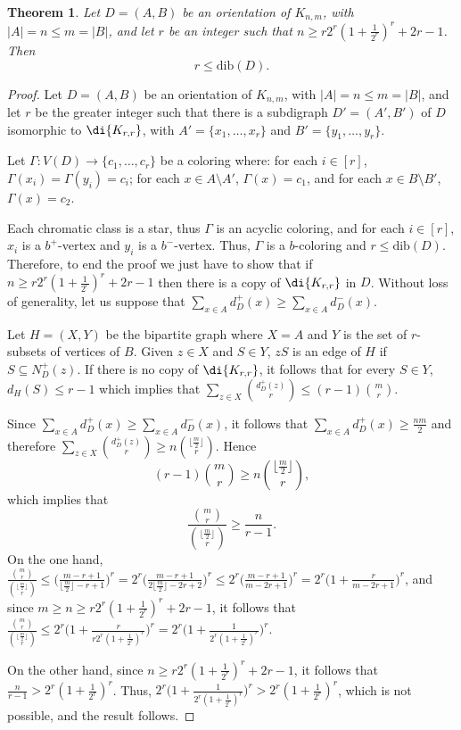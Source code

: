\documentclass[12pt]{article}
\newtheorem{theorem}{Theorem}
\begin{document}
\begin{theorem}\label{log} Let $D =(A, B)$ be an orientation of  $K_{n,m}$, with $|A| = n\leq m = |B|$, and let $r$ be an integer such that $n\geq r2^r(1+\frac{1}{2^r})^r+2r-1$. Then \[r\leq \text{dib}(D).\]
\end{theorem}
\begin{proof} Let $D =(A , B)$ be an orientation of  $K_{n,m}$, with $|A| = n\leq m = |B|$, and let  $r$ be the greater integer such that there is a subdigraph $D'=(A', B')$ of $D$ isomorphic to 
 $\di{K_{r,r}}$, with $A'= \{x_1, \dots, x_r\}$ and $B'= \{y_1, \dots, y_r\}$.  

Let  $\Gamma : V(D) \rightarrow \{c_1, \dots, c_r\}$ be a coloring  where: for each $i\in [r]$, $\Gamma(x_i) = \Gamma(y_i) = c_i$; for each $x\in A\setminus A'$, $\Gamma(x) = c_1$, and for each $x\in B\setminus B'$, $\Gamma(x) = c_2$. 

Each chromatic class is a star, thus $\Gamma$ is an acyclic coloring, and for each $i\in [r]$, $x_i$ is a $b^+$-vertex and $y_i$ is a $b^-$-vertex. Thus, $\Gamma$ is a $b$-coloring and $r\leq \text{dib}(D)$. 
Therefore, to end the proof we just have to show that if $n\geq r2^r(1+\frac{1}{2^r})^r+2r-1$ then there is a copy of  $\di{K_{r,r}}$ in $D$. Without loss of generality, let us suppose that $\sum\limits_{x\in A}d_D^+(x) \geq \sum\limits_{x\in A}d_D^-(x)$.  

Let $H=(X,Y)$ be the bipartite graph where $X=A$ and $Y$ is the set of $r$-subsets of vertices of $B$. Given $z\in X$ and $S\in Y$, $zS$ is an edge of $H$ if  $S\subseteq N^+_D(z)$. If there is no copy of $\di{K_{r,r}}$, it follows that for every $S\in Y$, $d_H(S)\leq r-1$ which implies that  $\sum\limits_{z\in X} {{d_D^+(z)}\choose {r}} \leq (r-1) {{m}\choose {r}}$. 

 Since $\sum\limits_{x\in A}d_D^+(x) \geq \sum\limits_{x\in A}d_D^-(x)$, it follows that 
 $\sum\limits_{x\in A}d_D^+(x)\geq \frac{nm}{2}$ and therefore  $\sum\limits_{z\in X} {{d_D^+(z)}\choose {r}} \geq n{{\lfloor\frac{m}{2}\rfloor}\choose {r}}$. Hence  $$(r-1){{m}\choose {r}}\geq  n{{\lfloor\frac{m}{2}\rfloor}\choose {r}},$$ which implies that $$\frac{{{m}\choose {r}}}{{{\lfloor\frac{m}{2}\rfloor}\choose {r}}}\geq \frac{n}{r-1}.$$ 
 On the one hand, $\frac{{{m}\choose {r}}}{{{\lfloor\frac{m}{2}\rfloor}\choose {r}}}\leq \big(\frac{m-r+1}{\lfloor\frac{m}{2}\rfloor -r+1}\big)^r= 2^r\big(\frac{m-r+1}{2\lfloor\frac{m}{2}\rfloor -2r+2}\big)^r\leq 2^r\big(\frac{m-r+1}{m -2r+1}\big)^r =  2^r\big(1+\frac{r}{m -2r+1}\big)^r$, and since $m\geq n \geq r2^r(1+\frac{1}{2^r})^r+2r-1$, it follows that $\frac{{{m}\choose {r}}}{{{\lfloor\frac{m}{2}\rfloor}\choose {r}}}\leq 2^r\big(1+ \frac{r}{r2^r(1+\frac{1}{2^r})^r}\big)^r= 2^r\big(1+ \frac{1}{2^r(1+\frac{1}{2^r})^r}\big)^r$. 
 
  On the other hand, since $n\geq r2^r(1+\frac{1}{2^r})^r+2r-1$, it follows that   $\frac{n}{r-1}> 2^r(1+\frac{1}{2^r})^r$.  Thus,  $2^r\big(1+ \frac{1}{2^r(1+\frac{1}{2^r})^r}\big)^r> 2^r(1+\frac{1}{2^r})^r$, which  is not possible, and the result follows. \end{proof}
\end{document}
